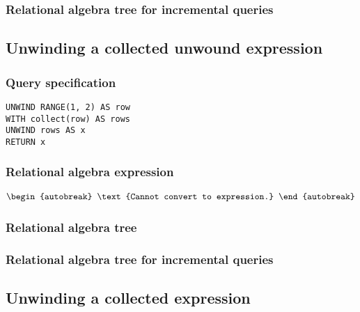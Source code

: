 \subsubsection*{Relational algebra tree for incremental queries}


\subsection{Unwinding a collected unwound expression}

\subsubsection*{Query specification}

\begin{lstlisting}
UNWIND RANGE(1, 2) AS row
WITH collect(row) AS rows
UNWIND rows AS x
RETURN x
\end{lstlisting}

\subsubsection*{Relational algebra expression}

\begin{align*}
\begin{autobreak}
\text{Cannot convert to expression.}
\end{autobreak}
\end{align*}

\subsubsection*{Relational algebra tree}


\subsubsection*{Relational algebra tree for incremental queries}


\subsection{Unwinding a collected expression}

